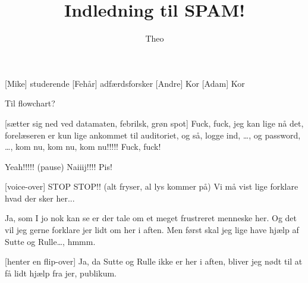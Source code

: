 \documentclass[danish]{article}
\title{Indledning til SPAM!}
\author{Theo}
\begin{document}
\maketitle

\begin{roles}
  [Mike] studerende
  [Fehår] adfærdsforsker
  [Andre] Kor
  [Adam] Kor
\end{roles}

\begin{props}
   Til flowchart?
\end{props}

\begin{sketch}



[sætter sig ned ved datamaten, febrilsk, grøn spot]
Fuck, fuck, jeg kan lige nå det, forelæseren er kun lige ankommet til
auditoriet, og så, logge ind, \ldots, og password, \ldots, kom nu, kom nu,
kom nu!!!!! Fuck, fuck!


Yeah!!!!! (pause) Naiiij!!!! Pis!


[voice-over] STOP STOP!! (alt fryser, al lys
kommer på) Vi må vist lige forklare hvad der sker her...


 Ja, som I jo nok kan se er der tale om et meget frustreret
menneske her. Og det vil jeg gerne forklare jer lidt om her i aften. Men
først skal jeg lige have hjælp af Sutte og Rulle\ldots, hmmm.


[henter en flip-over] Ja, da Sutte og Rulle ikke er her i aften,
bliver jeg nødt til at få lidt hjælp fra jer, publikum.



\end{sketch}
\end{document}
